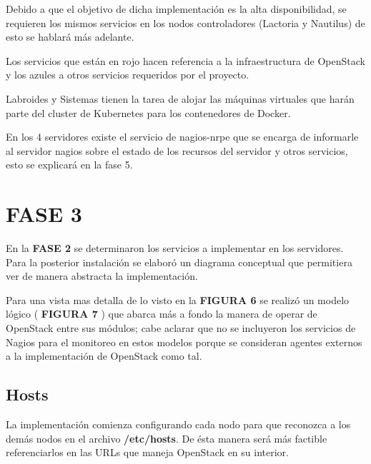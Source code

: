     
    Debido a que el objetivo de dicha implementación es la alta disponibilidad, se requieren los mismos servicios en los nodos controladores (Lactoria y Nautilus) de esto se hablará más adelante.
         
      
      Los servicios que están en rojo hacen referencia a la infraestructura de OpenStack y los azules a otros servicios requeridos por el proyecto.
      
      Labroides y Sistemas tienen la tarea de alojar las máquinas virtuales que harán parte del cluster de Kubernetes para los contenedores de Docker.
      
      En los 4 servidores existe el servicio de nagios-nrpe que se encarga de informarle al servidor nagios sobre el estado de los recursos del servidor y otros servicios, esto se explicará en la fase 5. 
      
      
      
    \section{FASE 3}
    
      En la \textbf{FASE 2} se determinaron los servicios a implementar en los servidores. Para la posterior instalación se elaboró un diagrama conceptual que permitiera ver de manera abstracta la implementación. 
    
    
    Para una vista mas detalla de lo visto en la \textbf{FIGURA 6} se realizó un modelo lógico ( \textbf{FIGURA 7} ) que abarca más a fondo la manera de operar de OpenStack entre sus módulos; cabe aclarar que no se incluyeron los servicios de Nagios para el monitoreo en estos modelos porque se consideran agentes externos a la implementación de OpenStack como tal.
    
    
    \subsection{Hosts}
    La implementación comienza configurando cada nodo para que reconozca a los demás nodos en el archivo \textbf{/etc/hosts}. De ésta manera será más factible referenciarlos en las URLs que maneja OpenStack en su interior.
    
